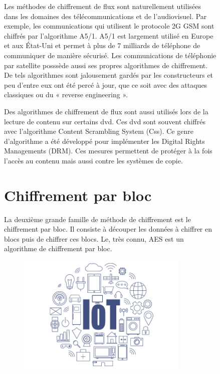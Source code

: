 \begin{figure}[!h]
	Les méthodes de chiffrement de flux sont naturellement utilisées dans les
	domaines des télécommunications et de l'audiovisuel. Par exemple, les
	communications qui utilisent le protocole 2G GSM sont chiffrés par
	l'algorithme A5/1. A5/1 est largement utilisé en Europe et aux État-Uni et
	permet à plus de 7 milliards de téléphone de communiquer de manière
	sécurisé\cite{7milliards}. Les communications de téléphonie par satellite
	posssède aussi ses propres algorithmes de chiffrement. De tels algorithmes
	sont jalousement gardés par les constructeurs et peu d'entre eux ont été percé à
	jour, que ce soit avec des attaques classiques ou du « reverse engineering ».

	Des algorithmes de chiffrement de flux sont aussi utilisés lors de la lecture
	de contenu sur certains dvd. Ces dvd sont souvent chiffrés avec l'algorithme
	Content Scrambling System (Css). Ce genre d'algorithme a été développé pour
	implémenter les Digital Rights Managements (DRM). Ces mesures permettent de
	protéger à la fois l'accès au contenu mais aussi contre les systèmes de copie.
	\section{Chiffrement par bloc}

	La deuxième grande famille de méthode de chiffrement est le chiffrement par
	bloc. Il consiste à découper les données à chiffrer en blocs puis de chiffrer
	ces blocs. Le, très connu, AES est un algorithme de chiffrement par bloc.

	\begin{figure}[!h]
		\centering
		\includegraphics[width=0.9\textwidth]{imgs/application/IOT.jpg}
		\label{IOT}
	\end{figure}


\end{figure}
